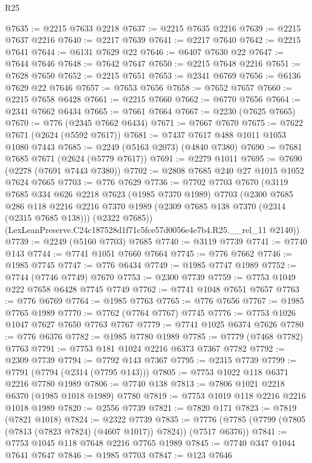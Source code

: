 \begin{lexlean}{R25}
\begin{coremodule}
@7635 := @2215 @7633 @2218
@7637 := @2215 @7635 @2216
@7639 := @2215 @7637 @2216
@7640 := @2217 @7639
@7641 := @2217 @7640
@7642 := @2215 @7641
@7644 := @6131 @7629 @22
@7646 := @6407 @7630 @22
@7647 := @7644 @7646
@7648 := @7642 @7647
@7650 := @2215 @7648 @2216
@7651 := @7628 @7650
@7652 := @2215 @7651
@7653 := @2341 @6769
@7656 := @6136 @7629 @22 @7646
@7657 := @7653 @7656
@7658 := @7652 @7657
@7660 := @2215 @7658 @6428
@7661 := @2215 @7660
@7662 := @6770 @7656
@7664 := @2341 @7662 @6434
@7665 := @7661 @7664
@7667 := @2230 (@7625 @7665)
@7670 := @776 (@2345 @7662 @6434)
@7671 := @7667 @7670
@7675 := @7622 @7671 (@2624 (@5592 @7617))
@7681 := @7437 @7617 @488 @1011 @1053 @1080 @7443
@7685 := @2249 (@5163 @2073) (@4840 @7380)
@7690 := @7681 @7685 @7671 (@2624 (@5779 @7617))
@7691 := @2279 @1011
@7695 := @7690 (@2278 (@7691 @7443 @7380))
@7702 := @2808 @7685 @240 @27 @1015 @1052 @7624 @7665
@7703 := @776 @7629
@7736 := @7702
    @7703
    @7670
    (@3119
      @7685
      @334
      @626
      @2218
      @7623
      (@1985 @7370 @1989)
      @7703
      (@2300
        @7685
        @286
        @118
        @2216
        @2216
        @7370
        @1989
        (@2309 @7685 @138 @7370 (@2314 (@2315 @7685 @138)))
        (@2322 @7685))
      (LexLeanPreserve.C24c187528d1f71c5fce57d0056e4e7b4.R25.__rel_11 @2140))
@7739 := @2249 (@5160 @7703) @7685
@7740 := @3119 @7739
@7741 := @7740 @143
@7744 := @7741 @1051 @7660 @7664
@7745 := @776 @7662
@7746 := @1985 @7745
@7747 := @776 @6434
@7749 := @1985 @7747 @1989
@7752 := @7744 (@7746 @7749) @7670
@7753 := @2300 @7739
@7759 := @7753 @1049 @222 @7658 @6428 @7745 @7749
@7762 := @7741 @1048 @7651 @7657
@7763 := @776 @6769
@7764 := @1985 @7763
@7765 := @776 @7656
@7767 := @1985 @7765 @1989
@7770 := @7762 (@7764 @7767) @7745
@7776 := @7753 @1026 @1047 @7627 @7650 @7763 @7767
@7779 := @7741 @1025 @6374 @7626
@7780 := @776 @6376
@7782 := @1985 @7780 @1989
@7785 := @7779 (@7468 @7782) @7763
@7791 := @7753 @181 @1024 @2216 @6373 @7367 @7782
@7792 := @2309 @7739
@7794 := @7792 @143 @7367
@7795 := @2315 @7739
@7799 := @7791 (@7794 (@2314 (@7795 @143)))
@7805 := @7753 @1022 @118 @6371 @2216 @7780 @1989
@7806 := @7740 @138
@7813 := @7806 @1021 @2218 @6370 (@1985 @1018 @1989) @7780
@7819 := @7753 @1019 @118 @2216 @2216 @1018 @1989
@7820 := @2556 @7739
@7821 := @7820 @171
@7823 := @7819 (@7821 @1018)
@7824 := @2322 @7739
@7835 := @7776 (@7785 (@7799 (@7805 (@7813 (@7823 @7824) (@4607 @1017)) @7824)) (@7517 @6376))
@7841 := @7753 @1045 @118 @7648 @2216 @7765 @1989
@7845 := @7740 @347 @1044 @7641 @7647
@7846 := @1985 @7703
@7847 := @123 @7646

\end{coremodule}
\end{lexlean}
